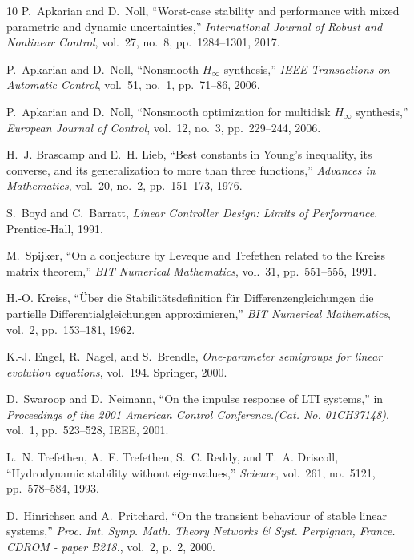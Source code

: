 \documentclass[12pt, a4paper,reqno]{amsart}
\theoremstyle{definition}
\begin{document}
\begin{thebibliography}{10}
P.~Apkarian and D.~Noll, ``Worst-case stability and performance with mixed
  parametric and dynamic uncertainties,'' {\em International Journal of Robust
  and Nonlinear Control}, vol.~27, no.~8, pp.~1284--1301, 2017.

P.~Apkarian and D.~Noll, ``Nonsmooth {$H_\infty$} synthesis,'' {\em IEEE
  Transactions on Automatic Control}, vol.~51, no.~1, pp.~71--86, 2006.

P.~Apkarian and D.~Noll, ``Nonsmooth optimization for multidisk {$H_\infty$}
  synthesis,'' {\em European Journal of Control}, vol.~12, no.~3, pp.~229--244,
  2006.

H.~J. Brascamp and E.~H. Lieb, ``Best constants in {Y}oung's inequality, its
  converse, and its generalization to more than three functions,'' {\em
  Advances in Mathematics}, vol.~20, no.~2, pp.~151--173, 1976.

S.~Boyd and C.~Barratt, {\em Linear Controller Design: {L}imits of
  Performance}.
\newblock Prentice-Hall, 1991.

M.~Spijker, ``On a conjecture by {L}eveque and {T}refethen related to the
  {K}reiss matrix theorem,'' {\em BIT Numerical Mathematics}, vol.~31,
  pp.~551--555, 1991.

H.-O. Kreiss, ``{\"U}ber die {S}tabilit{\"a}tsdefinition f{\"u}r
  {D}ifferenzengleichungen die partielle {D}ifferentialgleich\-ungen
  approximieren,'' {\em BIT Numerical Mathematics}, vol.~2, pp.~153--181, 1962.

K.-J. Engel, R.~Nagel, and S.~Brendle, {\em One-parameter semigroups for linear
  evolution equations}, vol.~194.
\newblock Springer, 2000.

D.~Swaroop and D.~Neimann, ``On the impulse response of {LTI} systems,'' in
  {\em Proceedings of the 2001 American Control Conference.(Cat. No.
  01CH37148)}, vol.~1, pp.~523--528, IEEE, 2001.

L.~N. Trefethen, A.~E. Trefethen, S.~C. Reddy, and T.~A. Driscoll,
  ``Hydrodynamic stability without eigenvalues,'' {\em Science}, vol.~261,
  no.~5121, pp.~578--584, 1993.

D.~Hinrichsen and A.~Pritchard, ``On the transient behaviour of stable linear
  systems,'' {\em Proc. Int. Symp. Math. Theory Networks \& Syst. Perpignan,
  France. CDROM - paper B218.}, vol.~2, p.~2, 2000.


\end{thebibliography}
\end{document}
